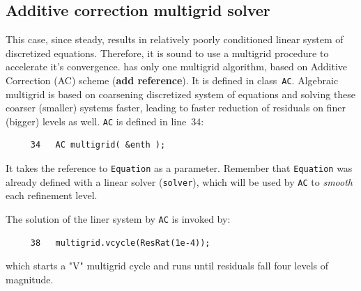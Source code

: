 \subsection{Additive correction multigrid solver}

This case, since steady, results in relatively poorly conditioned linear
system of discretized equations. Therefore, it is sound to use a multigrid
procedure to accelerate it's convergence. {\psiboil} has only one multigrid
algorithm, based on Additive Correction (AC) scheme ({\bf add reference}). It
is defined in class~{\tt AC}. Algebraic multigrid is based on coarsening
discretized system of equations and solving these coarser (smaller) systems
faster, leading to faster reduction of residuals on finer (bigger) levels
as well. {\tt AC} is defined in line~34:
%
{\small \begin{verbatim}
     34   AC multigrid( &enth );  
\end{verbatim}}
% 
It takes the reference to {\tt Equation} as a parameter. Remember that
{\tt Equation} was already defined with a linear solver ({\tt solver}),
which will be used by {\tt AC} to {\em smooth} each refinement level. 

The solution of the liner system by {\tt AC} is invoked by:
%
{\small \begin{verbatim}
     38   multigrid.vcycle(ResRat(1e-4));
\end{verbatim}}
% 
which starts a "V" multigrid cycle and runs until residuals fall four
levels of magnitude. 

